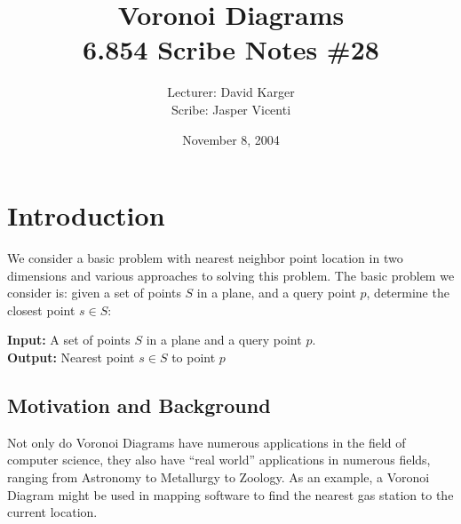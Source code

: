\documentclass{article}
\title{Voronoi Diagrams\\6.854 Scribe Notes \#28}
\date{November 8, 2004}
\author{Lecturer: David Karger\\ Scribe: Jasper Vicenti}
\begin{document}
%
%
%
%

%



\section{Introduction}

We consider a basic problem with nearest neighbor point location in
two dimensions and various
approaches to solving this problem. The basic problem we consider is:
given a set of points $S$ in a plane, and a query point $p$, determine 
the closest point $s \in S$:

{\bf Input:} A set of points $S$ in a plane and a query point $p$.\\
{\bf Output:} Nearest point $s \in S$ to point $p$

\subsection{Motivation and Background}
Not only do Voronoi Diagrams have numerous applications in the field
of computer science, they also have ``real world'' applications in numerous
fields, ranging from Astronomy to Metallurgy to Zoology. As an example, 
a Voronoi Diagram might be used in mapping software to find the nearest gas station to 
the current location.
\end{document}
